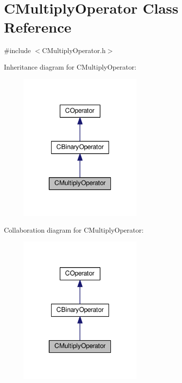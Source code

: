 \hypertarget{classCMultiplyOperator}{}\section{C\+Multiply\+Operator Class Reference}
\label{classCMultiplyOperator}


{\ttfamily \#include $<$C\+Multiply\+Operator.\+h$>$}



Inheritance diagram for C\+Multiply\+Operator\+:\nopagebreak
\begin{figure}[H]
\begin{center}
\leavevmode
\includegraphics[width=175pt]{classCMultiplyOperator__inherit__graph}
\end{center}
\end{figure}


Collaboration diagram for C\+Multiply\+Operator\+:\nopagebreak
\begin{figure}[H]
\begin{center}
\leavevmode
\includegraphics[width=175pt]{classCMultiplyOperator__coll__graph}
\end{center}
\end{figure}

